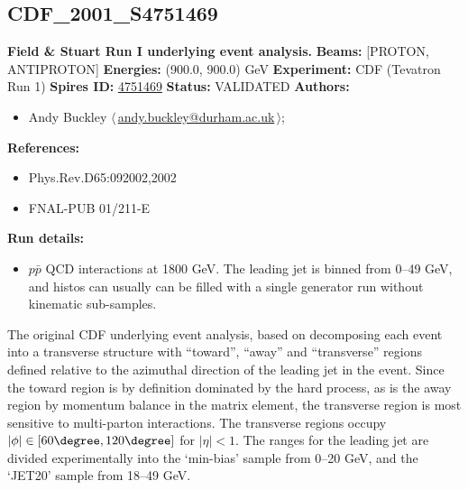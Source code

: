 \subsection[CDF\_2001\_S4751469]{CDF\_2001\_S4751469\,\cite{Affolder:2001xt}}
\textbf{Field \& Stuart Run I underlying event analysis.}\newline
\textbf{Beams:} [PROTON, ANTIPROTON] \newline
\textbf{Energies:} (900.0, 900.0) GeV \newline
\textbf{Experiment:} CDF (Tevatron Run 1) \newline
\textbf{Spires ID:} \href{http://www.slac.stanford.edu/spires/find/hep/www?rawcmd=key+4751469}{4751469}\newline
\textbf{Status:} VALIDATED\newline
\textbf{Authors:}
\begin{itemize}
  \item Andy Buckley $\langle\,$\href{mailto:andy.buckley@durham.ac.uk}{andy.buckley@durham.ac.uk}$\,\rangle$;
\end{itemize}
\textbf{References:}
\begin{itemize}
  \item Phys.Rev.D65:092002,2002
  \item FNAL-PUB 01/211-E
\end{itemize}
\textbf{Run details:}
\begin{itemize}

  \item $p\bar{p}$ QCD interactions at 1800 GeV. The leading jet is binned from 0--49 GeV, and histos can usually can be filled with a single generator run without kinematic sub-samples.\end{itemize}

\noindent The original CDF underlying event analysis, based on decomposing each event into a transverse structure with ``toward'', ``away'' and ``transverse'' regions defined relative to the azimuthal direction of the leading jet in the event. Since the toward region is by definition dominated by the hard process, as is the away region by momentum balance in the matrix element, the transverse region is most sensitive to multi-parton interactions. The transverse regions occupy $|\phi| \in [60\degree, 120\degree]$ for $|\eta| < 1$. The \pT ranges for the leading jet are divided experimentally into the `min-bias' sample from 0--20 GeV, and the `JET20' sample from 18--49 GeV.

